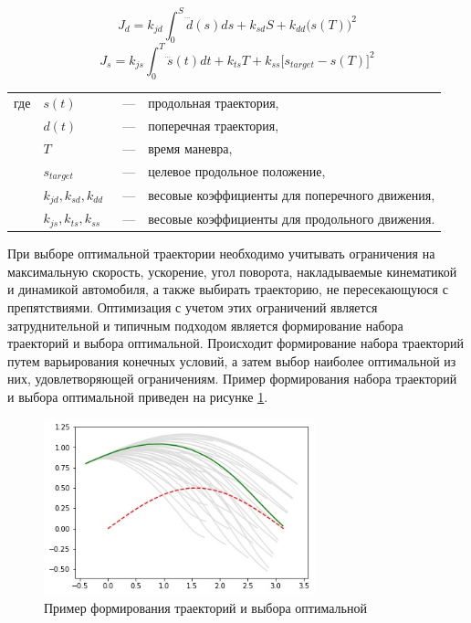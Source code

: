 \begin{equation}
    \label{eq:cost_lat}
    J_d = k_{jd}\int_0^S{\dddot{d}(s)ds} + k_{sd}S + k_{dd}\big(s(T)\big)^2
\end{equation}
\begin{equation}
    \label{eq:cost_lon}
    J_s = k_{js}\int_0^T{\dddot{s}(t)dt} + k_{ts}T + k_{ss}\big[s_{target} - s(T)\big]^2
\end{equation}

\noindent\begin{tabularx}{\linewidth}{lllX}
    где & $s(t)$         &~---& продольная траектория, \\
        & $d(t)$         &~---& поперечная траектория, \\
        & $T$            &~---& время маневра, \\
        & $s_{target}$   &~---& целевое продольное положение, \\
        & $k_{jd}, k_{sd}, k_{dd}$ &~---& весовые коэффициенты для поперечного движения,\\
        & $k_{js}, k_{ts}, k_{ss}$ &~---& весовые коэффициенты для продольного движения.
\end{tabularx}

При выборе оптимальной траектории необходимо учитывать ограничения на максимальную скорость, ускорение,
угол поворота, накладываемые кинематикой и динамикой автомобиля, а также выбирать траекторию, не 
пересекающуюся с препятствиями. Оптимизация с учетом этих ограничений является затруднительной и 
типичным подходом является формирование набора траекторий и выбора оптимальной. Происходит формирование
набора траекторий путем варьирования конечных условий, а затем выбор наиболее оптимальной из них, 
удовлетворяющей ограничениям. Пример формирования набора траекторий и выбора оптимальной приведен на
рисунке \ref{img:trajectory_planning_example}.

\begin{figure}[h]
    \centering
    \includegraphics[width=0.7\textwidth]{images/trajectory_planning_example}
    \caption{Пример формирования траекторий и выбора оптимальной}
    \label{img:trajectory_planning_example}
\end{figure}

